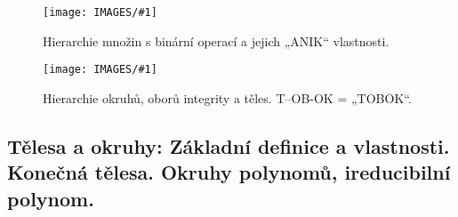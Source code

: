 \documentclass[a4paper,hidelinks]{article}
\newcommand{\myimagesuperbig}[1] {\texttt{[image: IMAGES/\#1]}}
\begin{document}
\begin{figure}
        \centering
        \begin{minipage}{0.45\textwidth}
        \myimagesuperbig{grupy}
        \caption{Hierarchie množin s binární operací a jejich „ANIK“ vlastnosti.}
        \label{fig:grupy}
        \end{minipage}%
        \hfill
        \begin{minipage}{0.45\textwidth}
        \myimagesuperbig{telesa}
        \caption{Hierarchie okruhů, oborů integrity a těles. T–OB-OK = „TOBOK“.}
        \label{fig:telesa}
        \end{minipage}
    \end{figure}

\subsection{Tělesa a okruhy: Základní definice a vlastnosti. Konečná tělesa. Okruhy polynomů, ireducibilní polynom.}
\end{document}
